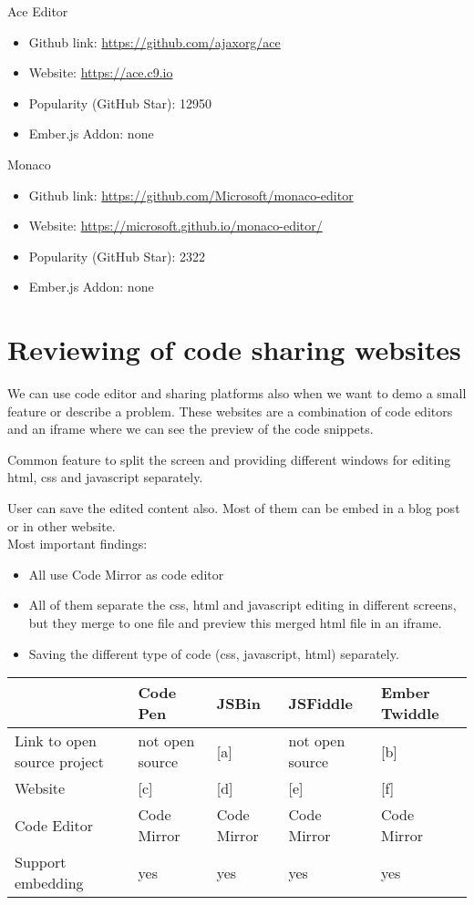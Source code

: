 \documentclass[11pt
              , a4paper
              , twoside
              , openright
              ]{report}
\begin{document}
\noindent Ace Editor
\begin{itemize}[noitemsep]
\item Github link: \url{https://github.com/ajaxorg/ace}
\item Website: \url{https://ace.c9.io}
\item Popularity (GitHub Star): 12950
\item Ember.js Addon: none
\end{itemize}

\noindent Monaco
\begin{itemize}[noitemsep]
\item Github link: \url{https://github.com/Microsoft/monaco-editor}
\item Website: \url{https://microsoft.github.io/monaco-editor/}
\item Popularity (GitHub Star): 2322
\item Ember.js Addon: none
\end{itemize}

\section{Reviewing of code sharing websites}

We can use code editor and sharing platforms also when we want to demo a small feature or describe a problem. These websites are a combination of code editors and an iframe where we can see the preview of the code snippets.

Common feature to split the screen and providing different windows for editing html, css and javascript separately.

User can save the edited content also. Most of them can be embed in a blog post or in other website. \\

\noindent Most important findings:
\begin{itemize}[noitemsep]
\item All use Code Mirror as code editor
\item All of them separate the css, html and javascript editing in different screens, but they merge to one file and preview this merged html file in an iframe.
\item Saving the different type of code (css, javascript, html) separately.
\end{itemize}

\newpage

\begin{tabular}{|l|l|l|l|l|}
\hline
& Code Pen & JSBin & JSFiddle & Ember Twiddle \\
\hline
Link to open source project & not open source & [a] & not open source & [b]  \\
\hline
Website & [c] & [d] & [e] & [f] \\
\hline
Code Editor & Code Mirror & Code Mirror & Code Mirror & Code Mirror \\
\hline
Support embedding & yes & yes & yes & yes \\
\hline
\end{tabular}\\
\end{document}
